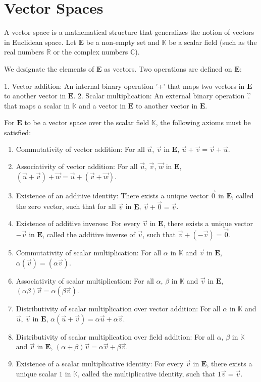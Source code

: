 \documentclass{article}
\begin{document}
\section{Vector Spaces}

A vector space is a mathematical structure that generalizes the notion of vectors in Euclidean space. Let $\mathbf{E}$ be a non-empty set and $\mathbb{K}$ be a scalar field (such as the real numbers $\mathbb{R}$ or the complex numbers $\mathbb{C}$).

We designate the elements of $\mathbf{E}$ as vectors. Two operations are defined on $\mathbf{E}$:

1. Vector addition: An internal binary operation '+' that maps two vectors in $\mathbf{E}$ to another vector in $\mathbf{E}$.
2. Scalar multiplication: An external binary operation '.' that maps a scalar in $\mathbb{K}$ and a vector in $\mathbf{E}$ to another vector in $\mathbf{E}$.

For $\mathbf{E}$ to be a vector space over the scalar field $\mathbb{K}$, the following axioms must be satisfied:

\begin{enumerate}
    \item Commutativity of vector addition: For all $\vec{u}$, $\vec{v}$ in $\mathbf{E}$, $\vec{u} + \vec{v} = \vec{v} + \vec{u}$.
    \item Associativity of vector addition: For all $\vec{u}$, $\vec{v}$, $\vec{w}$ in $\mathbf{E}$, $(\vec{u} + \vec{v}) + \vec{w} = \vec{u} + (\vec{v} + \vec{w})$.
    \item Existence of an additive identity: There exists a unique vector $\vec{0}$ in $\mathbf{E}$, called the zero vector, such that for all $\vec{v}$ in $\mathbf{E}$, $\vec{v} + \vec{0} = \vec{v}$.
    \item Existence of additive inverses: For every $\vec{v}$ in $\mathbf{E}$, there exists a unique vector $-\vec{v}$ in $\mathbf{E}$, called the additive inverse of $\vec{v}$, such that $\vec{v} + (-\vec{v}) = \vec{0}$.
    \item Commutativity of scalar multiplication: For all $\alpha$ in $\mathbb{K}$ and $\vec{v}$ in $\mathbf{E}$, $\alpha (\vec{v}) = (\alpha \vec{v})$.
    \item Associativity of scalar multiplication: For all $\alpha$, $\beta$ in $\mathbb{K}$ and $\vec{v}$ in $\mathbf{E}$, $(\alpha \beta) \vec{v} = \alpha (\beta \vec{v})$.
    \item Distributivity of scalar multiplication over vector addition: For all $\alpha$ in $\mathbb{K}$ and $\vec{u}$, $\vec{v}$ in $\mathbf{E}$, $\alpha (\vec{u} + \vec{v}) = \alpha \vec{u} + \alpha \vec{v}$.
    \item Distributivity of scalar multiplication over field addition: For all $\alpha$, $\beta$ in $\mathbb{K}$ and $\vec{v}$ in $\mathbf{E}$, $(\alpha + \beta) \vec{v} = \alpha \vec{v} + \beta \vec{v}$.
    \item Existence of a scalar multiplicative identity: For every $\vec{v}$ in $\mathbf{E}$, there exists a unique scalar $1$ in $\mathbb{K}$, called the multiplicative identity, such that $1 \vec{v} = \vec{v}$.
\end{enumerate}
\end{document}
